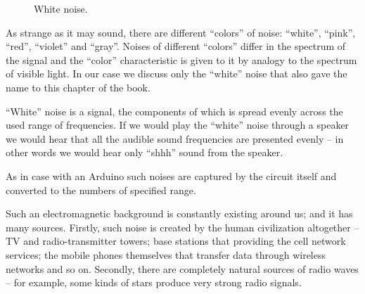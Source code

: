\documentclass[../sparc.tex]{subfiles}
\begin{document}
\begin{figure}[ht]
  \centering
  \caption{White noise.}
  \label{fig:white-noize}
\end{figure}

As strange as it may sound, there are different ``colors'' of noise: ``white'',
``pink'', ``red'', ``violet'' and ``gray''.  Noises of different ``colors''
differ in the spectrum of the signal and the ``color'' characteristic is given
to it by analogy to the spectrum of visible light.  In our case we discuss only
the ``white'' noise that also gave the name to this chapter of the book.

``White'' noise is a signal, the components of which is spread evenly across the
used range of frequencies.  If we would play the ``white'' noise through a
speaker we would hear that all the audible sound frequencies are presented
evenly -- in other words we would hear only ``shhh'' sound from the speaker.


As in case with an Arduino such noises are captured by the circuit itself and
converted to the numbers of specified range.

Such an electromagnetic background is constantly existing around us; and it has
many sources.  Firstly, such noise is created by the human civilization
altogether -- TV and radio-transmitter towers; base stations that providing the
cell network services; the mobile phones themselves that transfer data through
wireless networks and so on.  Secondly, there are completely natural sources of
radio waves -- for example, some kinds of stars produce very strong radio
signals.
\end{document}
